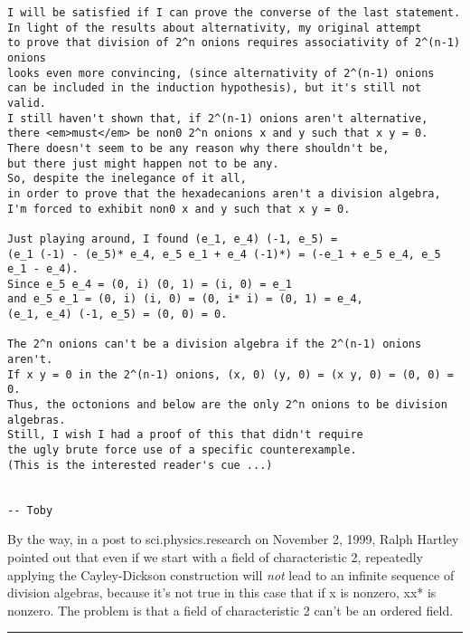 \begin{verbatim}
I will be satisfied if I can prove the converse of the last statement.
In light of the results about alternativity, my original attempt
to prove that division of 2^n onions requires associativity of 2^(n-1) onions
looks even more convincing, (since alternativity of 2^(n-1) onions
can be included in the induction hypothesis), but it's still not valid.
I still haven't shown that, if 2^(n-1) onions aren't alternative,
there <em>must</em> be non0 2^n onions x and y such that x y = 0.
There doesn't seem to be any reason why there shouldn't be,
but there just might happen not to be any.
So, despite the inelegance of it all,
in order to prove that the hexadecanions aren't a division algebra,
I'm forced to exhibit non0 x and y such that x y = 0.

Just playing around, I found (e_1, e_4) (-1, e_5) =
(e_1 (-1) - (e_5)* e_4, e_5 e_1 + e_4 (-1)*) = (-e_1 + e_5 e_4, e_5 e_1 - e_4).
Since e_5 e_4 = (0, i) (0, 1) = (i, 0) = e_1
and e_5 e_1 = (0, i) (i, 0) = (0, i* i) = (0, 1) = e_4,
(e_1, e_4) (-1, e_5) = (0, 0) = 0.

The 2^n onions can't be a division algebra if the 2^(n-1) onions aren't.
If x y = 0 in the 2^(n-1) onions, (x, 0) (y, 0) = (x y, 0) = (0, 0) = 0.
Thus, the octonions and below are the only 2^n onions to be division algebras.
Still, I wish I had a proof of this that didn't require
the ugly brute force use of a specific counterexample.
(This is the interested reader's cue ...)


-- Toby
\end{verbatim}
    

By the way, in a post to sci.physics.research on November 2, 1999, 
Ralph Hartley pointed out 
that even if we start with a field of characteristic 2, repeatedly
applying the Cayley-Dickson construction will \emph{not} lead to an
infinite sequence of division algebras, because it's not true
in this case that if x is nonzero, xx* is nonzero.  The problem is
that a field of characteristic 2 can't be an ordered field.



\par\noindent\rule{\textwidth}{0.4pt}
